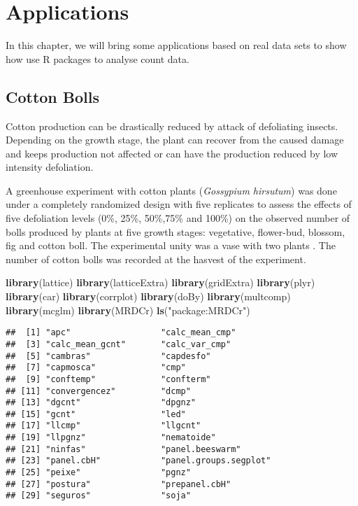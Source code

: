 \documentclass[9pt,a5paper,]{book}
\newenvironment{Shaded}{}{}
\newcommand{\KeywordTok}[1]{\textbf{{#1}}}
\newcommand{\StringTok}[1]{{#1}}
\newcommand{\NormalTok}[1]{{#1}}
\renewenvironment{Shaded}{\color{inputcolor}}{}
\theoremstyle{definition}
\theoremstyle{definition}
\theoremstyle{remark}
\begin{document}
\chapter{Applications}\label{applications}

In this chapter, we will bring some applications based on real data sets
to show how use R packages to analyse count data.

\section{Cotton Bolls}\label{cotton-bolls}

Cotton production can be drastically reduced by attack of defoliating
insects. Depending on the growth stage, the plant can recover from the
caused damage and keeps production not affected or can have the
production reduced by low intensity defoliation.

A greenhouse experiment with cotton plants (\emph{Gossypium hirsutum})
was done under a completely randomized design with five replicates to
assess the effects of five defoliation levels (0\%, 25\%, 50\%,75\% and
100\%) on the observed number of bolls produced by plants at five growth
stages: vegetative, flower-bud, blossom, fig and cotton boll. The
experimental unity was a vase with two plants \citep[for
more]{Silva2012a}. The number of cotton bolls was recorded at the
hasvest of the experiment.

\begin{Shaded}
\begin{Highlighting}[]
\KeywordTok{library}\NormalTok{(lattice)}
\KeywordTok{library}\NormalTok{(latticeExtra)}
\KeywordTok{library}\NormalTok{(gridExtra)}
\KeywordTok{library}\NormalTok{(plyr)}
\KeywordTok{library}\NormalTok{(car)}
\KeywordTok{library}\NormalTok{(corrplot)}
\KeywordTok{library}\NormalTok{(doBy)}
\KeywordTok{library}\NormalTok{(multcomp)}
\KeywordTok{library}\NormalTok{(mcglm)}
\KeywordTok{library}\NormalTok{(MRDCr)}
\KeywordTok{ls}\NormalTok{(}\StringTok{"package:MRDCr"}\NormalTok{)}
\end{Highlighting}
\end{Shaded}

\begin{verbatim}
##  [1] "apc"                  "calc_mean_cmp"       
##  [3] "calc_mean_gcnt"       "calc_var_cmp"        
##  [5] "cambras"              "capdesfo"            
##  [7] "capmosca"             "cmp"                 
##  [9] "conftemp"             "confterm"            
## [11] "convergencez"         "dcmp"                
## [13] "dgcnt"                "dpgnz"               
## [15] "gcnt"                 "led"                 
## [17] "llcmp"                "llgcnt"              
## [19] "llpgnz"               "nematoide"           
## [21] "ninfas"               "panel.beeswarm"      
## [23] "panel.cbH"            "panel.groups.segplot"
## [25] "peixe"                "pgnz"                
## [27] "postura"              "prepanel.cbH"        
## [29] "seguros"              "soja"
\end{verbatim}
\end{document}
